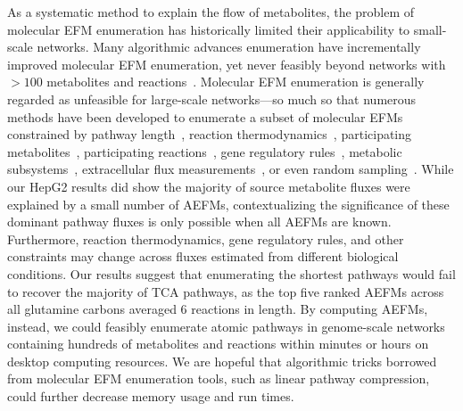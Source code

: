 \documentclass[12pt]{article}
\begin{document}
As a systematic method to explain the flow of metabolites, the problem of
molecular EFM enumeration has historically limited their applicability to
small-scale networks. Many algorithmic advances enumeration have
incrementally improved molecular EFM enumeration, yet never feasibly
beyond networks with $>100$ metabolites and
reactions~\citep{KampAxelvon2006M5fa,TerzerMarco2008Lcoe,vanKlinkenJanBert2016Faet}.
Molecular EFM enumeration is generally regarded as unfeasible for
large-scale networks---so much so that numerous methods have been
developed to enumerate a subset of molecular EFMs constrained by pathway
length~\citep{deFigueiredoLuisF2009Ctse}, reaction
thermodynamics~\citep{GerstlMatthiasP2015Mief}, participating
metabolites~\citep{PeyJon2014Dcoe}, participating
reactions~\citep{KaletaChristoph2009Ctwb}, gene regulatory
rules~\citep{JungreuthmayerChristian2013rSue}, metabolic
subsystems~\citep{SchusterS2002Etps,SchwartzJean-Marc2007Omfa},
extracellular flux
measurements~\citep{SoonsZitaITA2011Iomm,JungersRaphaelM.2011Fcom}, or
even random sampling~\citep{MachadoDaniel2012Rsoe}. While our HepG2
results did show the majority of source metabolite fluxes were explained
by a small number of AEFMs, contextualizing the significance of these
dominant pathway fluxes is only possible when all AEFMs are known.
Furthermore, reaction thermodynamics, gene regulatory rules, and other
constraints may change across fluxes estimated from different biological
conditions. Our results suggest that enumerating the shortest pathways
would fail to recover the majority of TCA pathways, as the top five ranked
AEFMs across all glutamine carbons averaged 6 reactions in length. By
computing AEFMs, instead, we could feasibly enumerate atomic pathways in
genome-scale networks containing hundreds of metabolites and reactions
within minutes or hours on desktop computing resources. We are hopeful
that algorithmic tricks borrowed from molecular EFM enumeration tools,
such as linear pathway compression, could further decrease memory usage
and run times.
\end{document}
